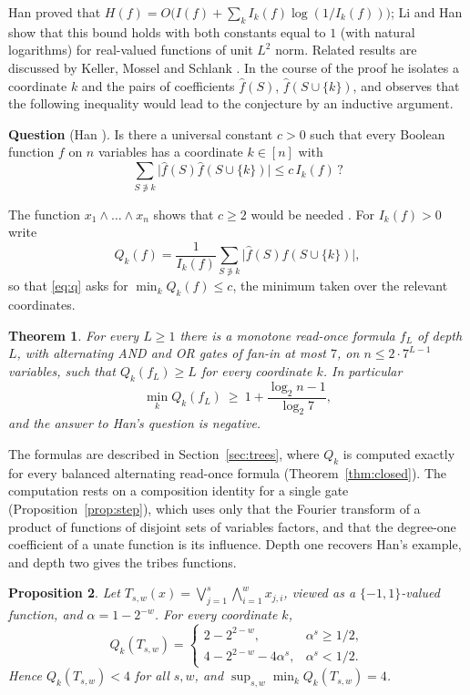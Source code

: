 \documentclass[11pt]{amsart}
\newtheorem{theorem}{Theorem}[section]
\newtheorem{proposition}[theorem]{Proposition}
\theoremstyle{definition}\newtheorem{definition}[theorem]{Definition}
\theoremstyle{remark}\newtheorem{remark}[theorem]{Remark}
\newcommand{\hf}{\widehat{f}}
\begin{document}
Han \cite{han} proved that $H(f)=O\bigl(I(f)+\sum_k I_k(f)\log(1/I_k(f))\bigr)$; Li and Han \cite{lh} show that
this bound holds with both constants equal to $1$ (with natural logarithms) for real-valued functions of unit $L^2$
norm. Related results are discussed by Keller, Mossel and Schlank \cite{kms}. In the course of the proof he isolates
a coordinate $k$ and the pairs of coefficients $\hf(S)$, $\hf(S\cup\{k\})$, and observes that the following inequality
would lead to the conjecture by an inductive argument.

\medskip
\noindent\textbf{Question} (Han \cite[Question~3.1]{han}). Is there a universal constant $c>0$ such that every
Boolean function $f$ on $n$ variables has a coordinate $k\in[n]$ with
\begin{equation}\label{eq:q}
\sum_{S\not\ni k}\bigl|\hf(S)\hf(S\cup\{k\})\bigr|\le c\,I_k(f)\,?
\end{equation}
\medskip

The function $x_1\wedge\dots\wedge x_n$ shows that $c\ge 2$ would be needed \cite{han}. For $I_k(f)>0$ write
\[
Q_k(f)=\frac{1}{I_k(f)}\sum_{S\not\ni k}\bigl|\hf(S)\hf(S\cup\{k\})\bigr| ,
\]
so that \eqref{eq:q} asks for $\min_k Q_k(f)\le c$, the minimum taken over the relevant coordinates.

\begin{theorem}\label{thm:main}
For every $L\ge1$ there is a monotone read-once formula $f_L$ of depth $L$, with alternating AND and OR gates of
fan-in at most $7$, on $n\le 2\cdot7^{L-1}$ variables, such that $Q_k(f_L)\ge L$ for every coordinate $k$. In
particular
\[
\min_k Q_k(f_L)\ \ge\ 1+\frac{\log_2 n-1}{\log_2 7},
\]
and the answer to Han's question is negative.
\end{theorem}

The formulas are described in Section~\ref{sec:trees}, where $Q_k$ is computed exactly for every balanced
alternating read-once formula (Theorem~\ref{thm:closed}). The computation rests on a composition identity for a
single gate (Proposition~\ref{prop:step}), which uses only that the Fourier transform of a product of functions of
disjoint sets of variables factors, and that the degree-one coefficient of a unate function is its influence.
Depth one recovers Han's example, and depth two gives the tribes functions.

\begin{proposition}\label{prop:tribes}
Let $T_{s,w}(x)=\bigvee_{j=1}^s\bigwedge_{i=1}^w x_{j,i}$, viewed as a $\{-1,1\}$-valued function, and
$\alpha=1-2^{-w}$. For every coordinate $k$,
\[
Q_k(T_{s,w})=\begin{cases}2-2^{2-w}, & \alpha^s\ge 1/2,\\ 4-2^{2-w}-4\alpha^s, & \alpha^s<1/2.\end{cases}
\]
Hence $Q_k(T_{s,w})<4$ for all $s,w$, and $\sup_{s,w}\min_kQ_k(T_{s,w})=4$.
\end{proposition}
\end{document}

